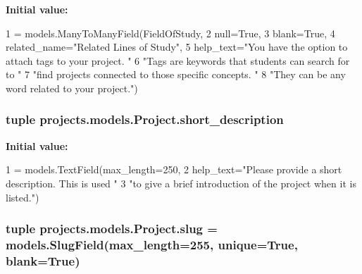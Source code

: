 {\bfseries Initial value\-:}
\begin{DoxyCode}
1 = models.ManyToManyField(FieldOfStudy,
2                                                     null=\textcolor{keyword}{True},
3                                                     blank=\textcolor{keyword}{True},
4                                                     related\_name=\textcolor{stringliteral}{"Related Lines of Study"},
5                                                     help\_text=\textcolor{stringliteral}{"You have the option to attach tags to your
       project. "}
6                                                               \textcolor{stringliteral}{"Tags are keywords that students can search
       for to "}
7                                                               \textcolor{stringliteral}{"find projects connected to those specific
       concepts. "}
8                                                               \textcolor{stringliteral}{"They can be any word related to your
       project."})
\end{DoxyCode}
\hypertarget{classprojects_1_1models_1_1_project_a85804e6a4300a17857178cfbc6765c09}{
\subsubsection[{short\-\_\-description}]{\setlength{\rightskip}{0pt plus 5cm}tuple projects.\-models.\-Project.\-short\-\_\-description\hspace{0.3cm}{\ttfamily [static]}}}\label{classprojects_1_1models_1_1_project_a85804e6a4300a17857178cfbc6765c09}
{\bfseries Initial value\-:}
\begin{DoxyCode}
1 = models.TextField(max\_length=250,
2                                          help\_text=\textcolor{stringliteral}{"Please provide a short description. This is used "}
3                                                    \textcolor{stringliteral}{"to give a brief introduction of the project when it is
       listed."})
\end{DoxyCode}
\hypertarget{classprojects_1_1models_1_1_project_ad9ce364f353425978667daf8a8d3ccd3}{
\subsubsection[{slug}]{\setlength{\rightskip}{0pt plus 5cm}tuple projects.\-models.\-Project.\-slug = models.\-Slug\-Field(max\-\_\-length=255, {\bf unique}=True, blank=True)\hspace{0.3cm}{\ttfamily [static]}}}\label{classprojects_1_1models_1_1_project_ad9ce364f353425978667daf8a8d3ccd3}
